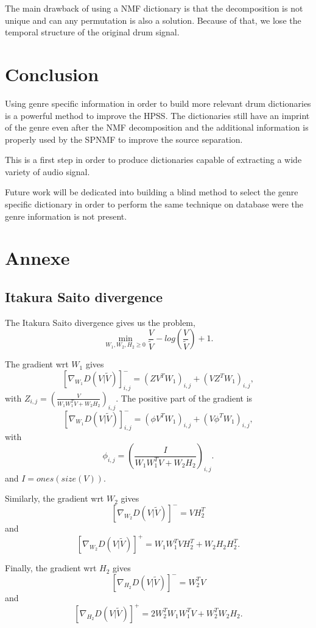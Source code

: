 \documentclass{article}
\begin{document}
The main drawback of using a NMF dictionary is that the decomposition is not unique and can any permutation is also a solution. Because of that, we lose the temporal structure of the original drum signal. 



\section{Conclusion}

Using genre specific information in order to build more relevant drum dictionaries is a powerful method to improve the HPSS. The dictionaries still have an imprint of the genre even after the NMF decomposition and the additional information is properly used by the SPNMF to improve the source separation.

This is a first step in order to produce dictionaries capable of extracting a wide variety of audio signal.

Future work will be dedicated into building a blind method to select the genre specific dictionary in order to perform the same technique on database were the genre information is not present. 



\section{Annexe}
 
\subsection{Itakura Saito divergence}\label{ISdisteq}
The Itakura Saito divergence gives us the problem,
$$\min_{W_1,W_2,H_2 \geq 0} \frac{V}{\tilde{V}} - log(\frac{V}{\tilde{V}}) +1.$$

The gradient wrt $W_1$ gives
$$[\nabla_{W_1} D(V|\tilde{V})]_{i,j}^{-} = (ZV^TW_1)_{i,j} + (VZ^TW_1)_{i,j},$$
with $Z_{i,j} = (\frac{V}{W_1W_1^TV + W_2H_2})_{i,j}$. 
The positive part of the gradient is
$$[\nabla_{W_1} D(V|\tilde{V})]_{i,j}^{-} = (\phi V^TW_1)_{i,j} + (V \phi^T W_1)_{i,j},$$
with $$ \phi_{i,j} = (\frac{I}{W_1W_1^TV + W_2H_2})_{i,j}.$$ and $I = ones(size(V))$.


Similarly, the gradient wrt $W_2$ gives
$$ [\nabla_{W_2} D(V|\tilde{V})]^{-} = VH_2^T $$
and
$$ [\nabla_{W_2} D(V|\tilde{V})]^{+} = W_1W_1^TVH_2^T + W_2H_2H_2^T.$$

Finally, the gradient wrt $H_2$ gives
$$ [\nabla_{H_2} D(V|\tilde{V})]^{-} = W_2^TV  $$
and
$$ [\nabla_{H_2} D(V|\tilde{V})]^{+} = 2W_2^TW_1W_1^TV + W_2^TW_2H_2. $$
\end{document}

